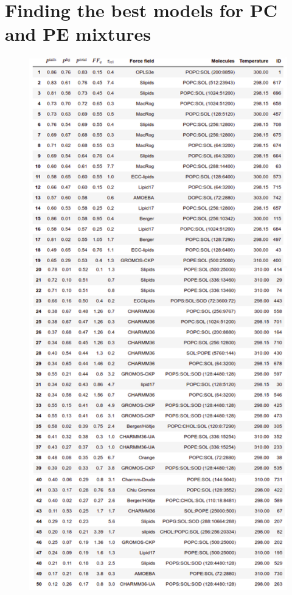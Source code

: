 \documentclass[fleqn,10pt]{wlscirepSI}
\begin{document}
\pagebreak
\section*{Finding the best models for PC and PE mixtures}

\begin{figure}[!h]
    \centering
    \includegraphics[height = 0.8\textheight]{Figures/totalrankingCOMPL.pdf}

\end{figure}
\end{document}
